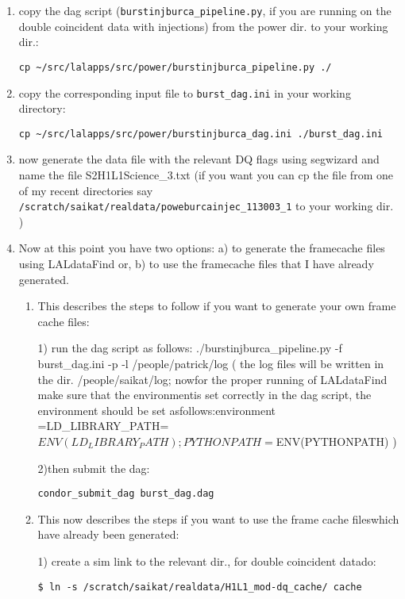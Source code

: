 \begin{enumerate}

\item copy the dag script (\texttt{burstinjburca\_pipeline.py}, if you are running
on the double coincident data with injections) from the power dir. to
your working dir.:
\begin{verbatim}
cp ~/src/lalapps/src/power/burstinjburca_pipeline.py ./
\end{verbatim}

\item copy the corresponding input file to \texttt{burst\_dag.ini} in your working
directory:
\begin{verbatim}
cp ~/src/lalapps/src/power/burstinjburca_dag.ini ./burst_dag.ini
\end{verbatim}

\item now generate the data file with the relevant DQ
flags using segwizard and name the file S2H1L1Science\_3.txt (if you
want you can cp the file from one of my recent directories
say \texttt{/scratch/saikat/realdata/poweburcainjec\_113003\_1} to your working
dir. )

\item Now at this point you have two options:   a) to generate the
framecache files using LALdataFind or,    b) to use the framecache
files that I have already generated.
\begin{enumerate}

\item This describes the  steps to follow if you want to generate your
own frame cache files:    

1) run
the dag script as follows:    ./burstinjburca\_pipeline.py -f
burst\_dag.ini -p -l /people/patrick/log     ( the log files will be
written in the dir. /people/saikat/log; nowfor the proper running of
LALdataFind make sure that the environmentis set correctly in the dag
script, the environment should be set asfollows:environment
=LD\_LIBRARY\_PATH=$ENV(LD_LIBRARY_PATH);PYTHONPATH=$ENV(PYTHONPATH)
)    

2)then submit the dag:
\begin{verbatim}
condor_submit_dag burst_dag.dag
\end{verbatim}

\item  This now describes the steps if you want to use the frame cache
fileswhich have already been generated:    

1) create a sim link to the relevant
dir., for double coincident datado:
\begin{verbatim}
$ ln -s /scratch/saikat/realdata/H1L1_mod-dq_cache/ cache   
\end{verbatim}


\end{enumerate}
\end{enumerate}
